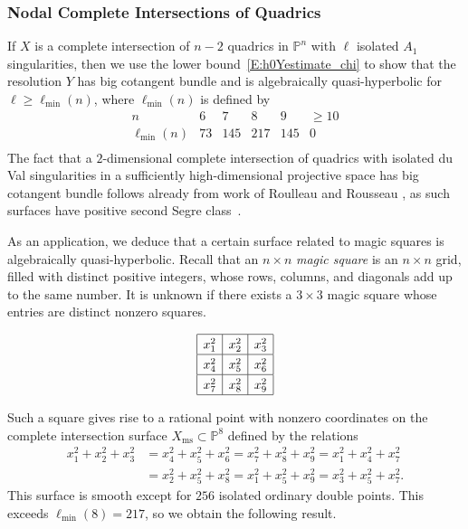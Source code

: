 \documentclass[12pt, reqno]{amsart}
\theoremstyle{definition}
\newcommand{\PP}{{\mathbb P}}
\newcommand{\Xms}{X_\mathrm{ms}}
\numberwithin{equation}{section}
\numberwithin{table}{section}
\newcommand{\defi}[1]{\emph{#1}} %
\begin{document}
\subsubsection{Nodal Complete Intersections of Quadrics}
\label{ex:CIsIntro}

If $X$ is a complete intersection of $n-2$ quadrics in $\PP^n$ with $\ell$ isolated $A_1$ singularities, then we use the lower bound~\eqref{E:h0Yestimate_chi} to show that the resolution $Y$ has big cotangent bundle and is algebraically quasi-hyperbolic for $\ell \geq \ell_{\mathrm{min}}(n)$, where $\ell_{\mathrm{min}}(n)$ is defined by
\[
\begin{array}{c||c|c|c|c|c}
n&6&7&8&9&\geq 10\\
\hline
\ell_\mathrm{min}(n)&73&145&217&145&0\\
\end{array}\]
The fact that a $2$-dimensional complete intersection of quadrics with isolated du Val singularities in a sufficiently high-dimensional projective space has big cotangent bundle follows already from work of Roulleau and Rousseau \cite{RoulleauRousseau}, as such surfaces have positive second Segre class~\cite{Miyaoka}.

As an application, we deduce that a certain surface related to magic squares is algebraically quasi-hyperbolic.  Recall that an $n\times n$ \defi{magic square} is an $n\times n$ grid, filled with distinct positive integers, whose rows, columns, and diagonals add up to the same number.  It is unknown if there exists a $3\times 3$ magic square whose entries are distinct nonzero squares.  

\[
\def\arraystretch{1.3}
\begin{array}{|c|c|c|}
\hline
x_1^2&x_2^2&x_3^2\\
\hline
x_4^2&x_5^2&x_6^2\\
\hline
x_7^2&x_8^2&x_9^2\\
\hline
\end{array}
\]

\smallskip
\noindent Such a square gives rise to a rational point with nonzero coordinates on the complete intersection surface $\Xms\subset \PP^8$ defined by the relations
\begin{align*}
x_1^2 + x_2^2 + x_3^2 &= x_4^2 + x_5^2 + x_6^2 = x_7^2 + x_8^2 + x_9^2 = x_1^2 + x_4^2 + x_7^2 \\
&= x_2^2 + x_5^2 + x_8^2 = x_1^2 + x_5^2 + x_9^2 = x_3^2 + x_5^2 + x_7^2.
\end{align*}
This surface is smooth except for $256$ isolated ordinary double points.  This exceeds $\ell_\text{min}(8)=217$, so we obtain the following result.
\end{document}
